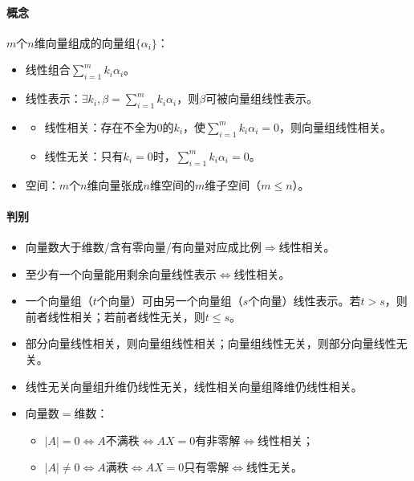 \documentclass[
12pt, %
a4paper, 
oneside, %
]{scrartcl}
\begin{document}
\paragraph{概念}
$ m $个$ n $维向量组成的向量组$ \{\alpha_i\} $：
\begin{itemize}
\item 线性组合$ \sum_{i = 1}^m k_i \alpha_i $。
\item 线性表示：$ \exists k_i, \beta = \sum_{i = 1}^m k_i \alpha_i $，则$ \beta $可被向量组线性表示。
\item 
\begin{itemize}
\item 线性相关：存在不全为$ 0 $的$ k_i $，使$ \sum_{i = 1}^m k_i \alpha_i = 0 $，则向量组线性相关。
\item 线性无关：只有$ k_i = 0 $时，$ \sum_{i = 1}^m k_i \alpha_i = 0 $。
\end{itemize}
\item 空间：$ m $个$ n $维向量张成$ n $维空间的$ m $维子空间（$ m \leq n $）。
\end{itemize}
\paragraph{判别}
\begin{itemize}
\item 向量数大于维数/含有零向量/有向量对应成比例$ \Rightarrow $线性相关。
\item 至少有一个向量能用剩余向量线性表示$ \Leftrightarrow $线性相关。
\item 一个向量组（$ t $个向量）可由另一个向量组（$ s $个向量）线性表示。若$ t > s $，则前者线性相关；若前者线性无关，则$ t \leq s $。
\item 部分向量线性相关，则向量组线性相关；向量组线性无关，则部分向量线性无关。
\item 线性无关向量组升维仍线性无关，线性相关向量组降维仍线性相关。
\item 向量数$ = $维数：
\begin{itemize}
\item $ |A| = 0 $$ \Leftrightarrow $$ A $不满秩$ \Leftrightarrow $$ AX = 0 $有非零解$ \Leftrightarrow $线性相关；
\item $ |A| \neq 0 $$ \Leftrightarrow $$ A $满秩$ \Leftrightarrow $$ AX = 0 $只有零解$ \Leftrightarrow $线性无关。
\end{itemize}
\end{itemize}
\end{document}
